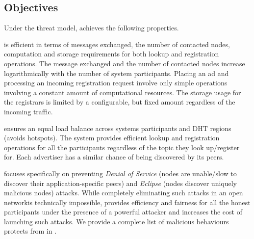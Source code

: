 \subsection{Objectives}
Under the threat model, \sysname achieves the following properties.

 \sysname is efficient in terms of messages exchanged, the number of contacted nodes, computation and storage requirements for both lookup and registration operations. The message exchanged and the number of contacted nodes increase logarithmically with the number of system participants. Placing an ad and processing an incoming registration request involve only simple operations involving a constant amount of computational resources. The storage usage for the registrars is limited by a configurable, but fixed amount regardless of the incoming traffic. 


 \sysname ensures an equal load balance across systems participants and DHT regions (\ie avoids hotspots). The system provides efficient lookup and registration operations for all the participants regardless of the topic they look up/register for. Each advertiser has a similar chance of being discovered by its peers. 

 \sysname focuses specifically on preventing \emph{Denial of Service} (nodes are unable/slow to discover their application-specific peers) and \emph{Eclipse} (nodes discover uniquely malicious nodes) attacks. While completely eliminating such attacks in an open networkis technically impossible, \sysname provides efficiency and fairness for all the honest participants under the presence of a powerful attacker and increases the cost of launching such attacks. We provide a complete list of malicious behaviours \sysname protects from in . 

